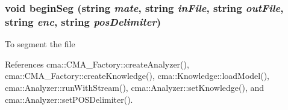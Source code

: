 \subsubsection[{beginSeg}]{\setlength{\rightskip}{0pt plus 5cm}void beginSeg (string {\em mate}, \/  string {\em inFile}, \/  string {\em outFile}, \/  string {\em enc}, \/  string {\em posDelimiter})}\label{SeggerCMD_8h_b30a0cc7bae3e3976cb797d3f026c20b}


To segment the file 

References cma::CMA\_\-Factory::createAnalyzer(), cma::CMA\_\-Factory::createKnowledge(), cma::Knowledge::loadModel(), cma::Analyzer::runWithStream(), cma::Analyzer::setKnowledge(), and cma::Analyzer::setPOSDelimiter().